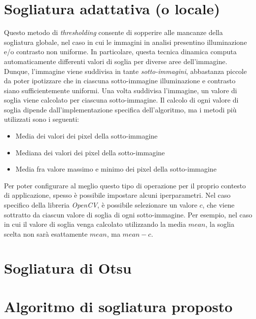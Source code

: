 \section{Sogliatura adattativa (o locale)}
Questo metodo di \textit{thresholding} consente di sopperire alle mancanze della sogliatura globale, nel caso in cui le immagini in analisi presentino illuminazione e/o contrasto non uniforme. In particolare, questa tecnica dinamica computa automaticamente differenti valori di soglia per diverse aree dell'immagine. Dunque, l'immagine viene suddivisa in tante \textit{sotto-immagini}, abbastanza piccole da poter ipotizzare che in ciascuna sotto-immagine illuminazione e contrasto siano sufficientemente uniformi. Una volta suddivisa l'immagine, un valore di soglia viene calcolato per ciascuna sotto-immagine. Il calcolo di ogni valore di soglia dipende dall'implementazione specifica dell'algoritmo, ma i metodi pi\`u utilizzati sono i seguenti:
\begin{itemize}
	\item Media dei valori dei pixel della sotto-immagine
	\item Mediana dei valori dei pixel della sotto-immagine
	\item Media fra valore massimo e minimo dei pixel della sotto-immagine
\end{itemize}
Per poter configurare al meglio questo tipo di operazione per il proprio contesto di applicazione, spesso \`e possibile impostare alcuni iperparametri. Nel caso specifico della libreria \textit{OpenCV}, \`e possibile selezionare un valore $c$, che viene sottratto da ciascun valore di soglia di ogni sotto-immagine. Per esempio, nel caso in cui il valore di soglia venga calcolato utilizzando la media $mean$, la soglia scelta non sar\`a esattamente $mean$, ma $mean - c$.


\section{Sogliatura di Otsu}
\section{Algoritmo di sogliatura proposto}
\label{sec:image-bin-proposed-approach}
